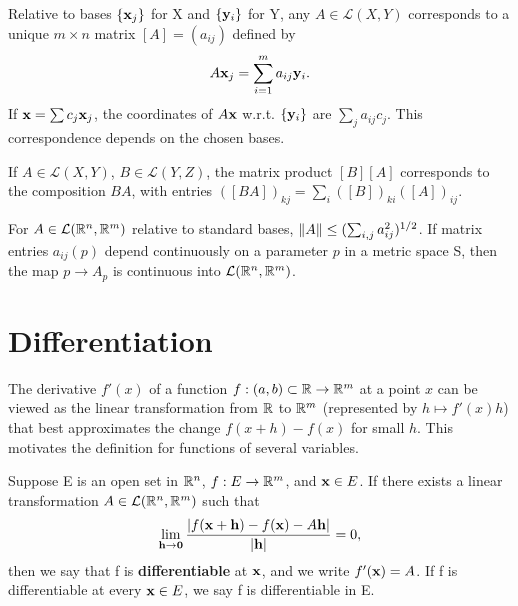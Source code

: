 \begin{remark}[Matrices]
  \label{rem:chap9:matrices}
  Relative to bases $\{ \mathbf{x}_j \}$ for X and $\{ \mathbf{y}_i \}$
  for Y, any $A \in \mathcal{L}(X, Y)$ corresponds to a unique $m
  \times n$ matrix $[A] = (a_{ij})$ defined by
  \begin{equation*} %
    A\vect{x}_j = \sum_{i=1}^m a_{ij} \vect{y}_i.
  \end{equation*}
  If $\mathbf{x} = \sum c_j \mathbf{x}_j$, the coordinates of $A\mathbf{x}$
  w.r.t. $\{ \mathbf{y}_i \}$ are $\sum_j a_{ij} c_j$. This
  correspondence depends on the chosen bases.

  If $A \in \mathcal{L}(X, Y)$, $B \in \mathcal{L}(Y, Z)$, the matrix
  product $[B][A]$ corresponds to the composition $BA$, with entries
  $([BA])_{kj} = \sum_i ([B])_{ki} ([A])_{ij}$.

  For $A \in \mathcal{L}(\mathbb{R}^n, \mathbb{R}^m)$ relative to standard bases,
  $\left\lVert A \right\rVert \le (\sum_{i,j} a_{ij}^2)^{1/2}$.
  If matrix entries $a_{ij}(p)$ depend continuously on a parameter
  $p$ in a metric space S, then the map $p \to A_p$ is continuous
  into $\mathcal{L}(\mathbb{R}^n, \mathbb{R}^m)$.
\end{remark}



\section{Differentiation}

The derivative $f'(x)$ of a function $f: (a,b) \subset \mathbb{R} \to \mathbb{R}^m$
at a point $x$ can be viewed as the linear transformation from $\mathbb{R}$
to $\mathbb{R}^m$ (represented by $h \mapsto f'(x)h$) that best approximates
the change $f(x+h) - f(x)$ for small $h$. This motivates the
definition for functions of several variables.

\begin{definition}[Differentiability]
  \label{def:chap9:differentiability}
  Suppose E is an open set in $\mathbb{R}^n$, $f: E \to \mathbb{R}^m$, and
  $\mathbf{x} \in E$. If there exists a linear transformation $A \in
  \mathcal{L}(\mathbb{R}^n, \mathbb{R}^m)$ such that
  \begin{equation} \label{eq:chap9:diff_limit_def}
    \lim_{\mathbf{h} \to \mathbf{0}} \frac{|f(\mathbf{x}+\mathbf{h}) -
    f(\mathbf{x}) - A\mathbf{h}|}{|\mathbf{h}|} = 0,
  \end{equation}
  then we say that f is \textbf{differentiable} at $\mathbf{x}$, and we
  write $f'(\mathbf{x}) = A$. If f is differentiable at every $\mathbf{x}
  \in E$, we say f is differentiable in E.
\end{definition}

